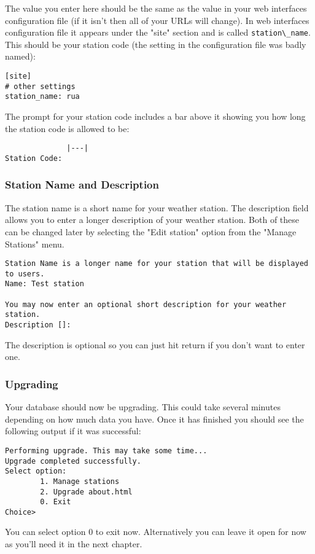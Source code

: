 \documentclass[a4paper,10pt,draft]{book}
\begin{document}
The value you enter here should be the same as the value in your web interfaces configuration file (if it isn't then all of your URLs will change). In web interfaces configuration file it appears under the "site" section and is called \verb|station\_name|. This should be your station code (the setting in the configuration file was badly named):
\begin{verbatim}
[site]
# other settings
station_name: rua
\end{verbatim}

The prompt for your station code includes a bar above it showing you how long the station code is allowed to be:
\begin{verbatim}
              |---|
Station Code:
\end{verbatim}

\subsubsection{Station Name and Description}
The station name is a short name for your weather station. The description field allows you to enter a longer description of your weather station. Both of these can be changed later by selecting the "Edit station" option from the "Manage Stations" menu.

\begin{verbatim}
Station Name is a longer name for your station that will be displayed 
to users.
Name: Test station

You may now enter an optional short description for your weather
station.
Description []:
\end{verbatim}

The description is optional so you can just hit return if you don't want to enter one.

\subsubsection{Upgrading}
Your database should now be upgrading. This could take several minutes depending on how much data you have. Once it has finished you should see the following output if it was successful:
\begin{verbatim}
Performing upgrade. This may take some time...
Upgrade completed successfully.
Select option:
        1. Manage stations
        2. Upgrade about.html
        0. Exit
Choice>
\end{verbatim}

You can select option 0 to exit now. Alternatively you can leave it open for now as you'll need it in the next chapter.
\end{document}
